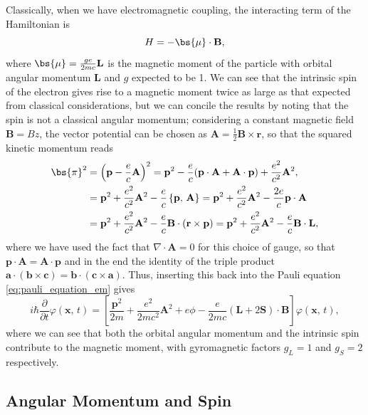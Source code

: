 Classically, when we have electromagnetic coupling, the interacting term of the Hamiltonian is
\[
    H = - \bs{\mu} \cdot \mathbf{B},
\]
where \(\bs{\mu} = \frac{g e}{2 m c} \mathbf{L}\) is the magnetic moment of the particle with orbital angular momentum \(\mathbf{L}\) and \(g\) expected to be 1. We can see that the intrinsic spin of the electron gives rise to a magnetic moment twice as large as that expected from classical considerations, but we can concile the results by noting that the spin is not a classical angular momentum; considering a constant magnetic field \(\mathbf{B} = B \hat{z}\), the vector potential can be chosen as \(\mathbf{A} = \frac{1}{2} \mathbf{B} \times \mathbf{r}\), so that the squared kinetic momentum reads
\[
    \begin{aligned}
        \bs{\pi}^2 & = \left(\mathbf{p} - \frac{e}{c} \mathbf{A}\right)^2 = \mathbf{p}^2 - \frac{e}{c} (\mathbf{p} \cdot \mathbf{A} + \mathbf{A} \cdot \mathbf{p}) + \frac{e^2}{c^2} \mathbf{A}^2,                                    \\
                   & = \mathbf{p}^2 + \frac{e^2}{c^2} \mathbf{A}^2 - \frac{e}{c} \left\{ \mathbf{p},\, \mathbf{A} \right\} = \mathbf{p}^2 + \frac{e^2}{c^2} \mathbf{A}^2 - \frac{2e}{c} \mathbf{p} \cdot \mathbf{A}                   \\
                   & = \mathbf{p}^2 + \frac{e^2}{c^2} \mathbf{A}^2 - \frac{e}{ c} \mathbf{B} \cdot \left(\mathbf{r} \times \mathbf{p}\right) = \mathbf{p}^2 + \frac{e^2}{c^2} \mathbf{A}^2 - \frac{e}{c} \mathbf{B} \cdot \mathbf{L},
    \end{aligned}
\]
where we have used the fact that \(\nabla \cdot \mathbf{A} = 0\) for this choice of gauge, so that \(\mathbf{p} \cdot \mathbf{A} = \mathbf{A} \cdot \mathbf{p}\) and in the end the identity of the triple product \(\mathbf{a} \cdot (\mathbf{b} \times \mathbf{c}) = \mathbf{b} \cdot (\mathbf{c} \times \mathbf{a})\). Thus, inserting this back into the Pauli equation \eqref{eq:pauli_equation_em} gives
\[
    i \hbar \frac{\partial}{\partial t} \varphi(\mathbf{x},\,t) = \left[\frac{\mathbf{p}^2}{2 m} + \frac{e^2}{2 m c^2} \mathbf{A}^2 + e \phi - \frac{e}{2 m c} (\mathbf{L} + 2 \mathbf{S}) \cdot \mathbf{B}\right] \varphi(\mathbf{x},\,t),
\]
where we can see that both the orbital angular momentum and the intrinsic spin contribute to the magnetic moment, with gyromagnetic factors \(g_L = 1\) and \(g_S = 2\) respectively.

\subsection{Angular Momentum and Spin}

